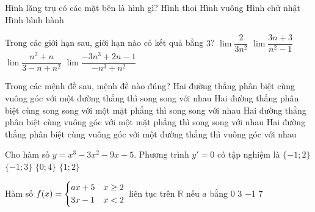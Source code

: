 \begin{ex}%
Hình lăng trụ có các mặt bên là hình gì?
\choice
{Hình thoi}
{Hình vuông}
{Hình chữ nhật}
{\True Hình bình hành}
\end{ex}
\begin{ex}%
Trong các giới hạn sau, giới hạn nào có kết quả bằng $3$?
\choice
{$\lim\dfrac{2}{3n^2}$}
{$\lim\dfrac{3n+3}{n^2-1}$}
{$\lim\dfrac{n^2+n}{3-n+n^2}$}
{\True $\lim\dfrac{-3n^3+2n-1}{-n^3+n^2}$}
\end{ex}
\begin{ex}%
Trong các mệnh đề sau, mệnh đề nào đúng?
\choice
{Hai đường thẳng phân biệt cùng vuông góc với một đường thẳng thì song song với nhau}
{Hai đường thẳng phân biệt cùng song song với một mặt phẳng thì song song với nhau}
{\True Hai đường thẳng phân biệt cùng vuông góc với một mặt phẳng thì song song với nhau}
{Hai đường thẳng phân biệt cùng vuông góc với một đường thẳng thì vuông góc với nhau}
\end{ex}
\begin{ex}%
Cho hàm số $y=x^3-3x^2-9x-5$. Phương trình $y'=0$ có tập nghiệm là
\choice
{$\{-1;2\}$}
{\True $\{-1;3\}$}
{$\{0;4\}$}
{$\{1;2\}$}
\end{ex}
\begin{ex}%
Hàm số $f(x)=\left\{\begin{aligned}&ax+5&x\geq 2\\&3x-1&x<2\end{aligned}\right.$ liên tục trên $\mathbb{R}$ nếu $a$ bằng
\choice
{\True $0$}
{$3$}
{$-1$}
{$7$}
\end{ex}

